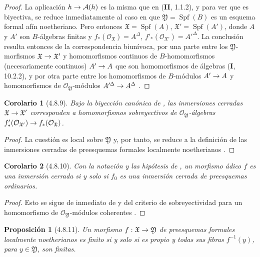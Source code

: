 \documentclass[10pt,oneside,openany]{book}
\theoremstyle{egaenv}\newtheorem*{env}{---}
\theoremstyle{egastatement}
\newtheorem*{proposition}{Proposición}
\newtheorem*{corollary}{Corolario}
\theoremstyle{egadescription}
\newcommand{\oldpage}[2][]{\marginnote{\normalfont\scriptsize\textbf{#1}\,|\,#2}\ignorespaces}
\renewcommand{\to}{\mathchoice{\longrightarrow}{\rightarrow}{\rightarrow}{\rightarrow}}
\begin{document}
\begin{proof}
La aplicación $h\to\mathcal A(h)$ es la misma que en (\textbf{II}, 1.1.2), y para ver que es biyectiva, se reduce inmediatamente al caso en que $\mathfrak Y=\operatorname{Spf}(B)$ es un esquema formal afín noetheriano.
Pero entonces $\mathfrak X=\operatorname{Spf}(A)$,
$\mathfrak X'=\operatorname{Spf}(A')$, donde $A$ y $A'$ son $B$-álgebras
finitas y $f_*(\mathcal O_{\mathfrak X})=A^\Delta$,
$f'_*(\mathcal O_{\mathfrak X'})=A'^\Delta$. La conclusión resulta entonces de
la correspondencia biunívoca, por una parte entre los $\mathfrak Y$-morfismos
$\mathfrak X\to\mathfrak X'$ y homomorfismos continuos de
$B$-homomorfismos (necesariamente continuos) $A'\to A$ que son homomorfismos de álgebras (\textbf{I}, 10.2.2), y por otra parte entre los homomorfismos de $B$-módulos
$A'\to A$ y homomorfismos de
$\mathcal O_{\mathfrak Y}$-módulos
$A'^\Delta\to A^\Delta$ .
\end{proof}

\begin{corollary}[4.8.9]
\label{III.4.8.9}
\label{III.4.8.9-fr}
Bajo la biyección canónica de , las inmersiones
cerradas $\mathfrak X\to\mathfrak X'$ corresponden a
homomorfismos sobreyectivos de $\mathcal O_{\mathfrak Y}$-álgebras
$f'_*(\mathcal O_{\mathfrak X'})\to f_*(\mathcal O_{\mathfrak X})$.
\end{corollary}

\begin{proof}
La cuestión es local sobre $\mathfrak Y$ y, por tanto, se reduce a la
definición de las inmersiones cerradas de preesquemas formales localmente
noetherianos .
\end{proof}

\begin{corollary}[4.8.10]
\label{III.4.8.10}
\label{III.4.8.10-fr}
Con la notación y las hipótesis de , un morfismo
ádico $f$ es una inmersión cerrada si y solo si $f_0$ es una
inmersión cerrada de preesquemas ordinarios.
\end{corollary}

\begin{proof}
Esto se sigue de inmediato de  y del criterio de
sobreyectividad para un homomorfismo de
$\mathcal O_{\mathfrak Y}$-módulos coherentes .
\end{proof}

\begin{proposition}[4.8.11]
\label{III.4.8.11}
\label{III.4.8.11-fr}
Un morfismo $f:\mathfrak X\to\mathfrak Y$ de preesquemas formales
localmente noetherianos
\oldpage[III]{149}
es finito si y solo si es propio y todas sus fibras
$f^{-1}(y)$, para $y\in\mathfrak Y$, son finitas.
\end{proposition}
\end{document}
